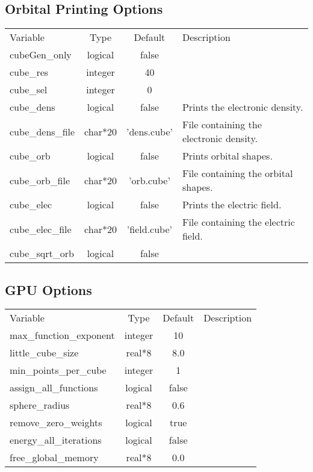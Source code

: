 \documentclass[journal=jctcce,manuscript=article]{achemso}
\begin{document}
    \subsection{Orbital Printing Options}
    \begin{table}  [H]
      \begin{center}
      \begin{tabular}{ l c c l}
         Variable & Type & Default & Description \\
         cubeGen\_only & logical & false & \\
         cube\_res & integer & 40 & \\
         cube\_sel & integer & 0 & \\
         cube\_dens & logical & false & Prints the electronic density.  \\
         cube\_dens\_file & char*20 & 'dens.cube' & File containing the electronic density. \\
         cube\_orb & logical & false & Prints orbital shapes. \\
         cube\_orb\_file & char*20 & 'orb.cube' & File containing the orbital shapes. \\
         cube\_elec & logical & false & Prints the electric field. \\
         cube\_elec\_file & char*20 & 'field.cube' & File containing the electric field. \\
         cube\_sqrt\_orb & logical & false & \\
       \end{tabular}
       \end{center}
      \label{lio.ecp.var}
    \end{table}    
    
    \subsection{GPU Options}
    \begin{table}  [H]
      \begin{center}
      \begin{tabular}{ l c c l}
         Variable & Type & Default & Description \\
         max\_function\_exponent & integer & 10 & \\
         little\_cube\_size & real*8 & 8.0 & \\
         min\_points\_per\_cube & integer & 1 & \\
         assign\_all\_functions & logical & false & \\
         sphere\_radius & real*8 & 0.6 & \\
         remove\_zero\_weights & logical & true & \\
         energy\_all\_iterations & logical & false & \\
         free\_global\_memory & real*8 & 0.0 & \\
       \end{tabular}
       \end{center}
      \label{lio.ecp.var}
    \end{table}    
\end{document}

